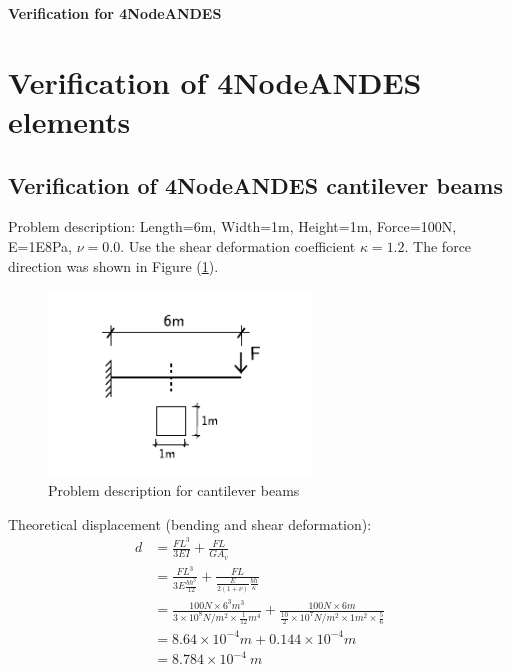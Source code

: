 \documentclass[fleqn,11pt]{article}
\begin{document}


















\newpage
\begin{center}
  \Large\textbf{Verification for 4NodeANDES}
\end{center}


\vskip 24pt

\section{Verification of 4NodeANDES elements}
\subsection{Verification of 4NodeANDES cantilever beams}





Problem description: Length=6m, Width=1m, Height=1m, Force=100N, E=1E8Pa, $\nu=0.0$. Use the shear deformation coefficient $\kappa=1.2$. The force direction was shown in Figure (\ref{fig Problem description for cantilever 4}). 

\begin{figure}[H]
  \centering
  \includegraphics[width=7cm]{../Figure-files/cantilever_6.pdf}
  \caption{Problem description for cantilever beams}
  \label{fig Problem description for cantilever 4}
\end{figure}


Theoretical displacement (bending and shear deformation):
\begin{equation}
  \begin{aligned}
  d &=\frac{FL^3}{3EI}+\frac{FL}{GA_v} \\
  &= \frac{FL^3}{3E\frac{bh^3}{12}}+\frac{FL}{\frac{E}{2(1+\nu)} \frac{bh}{\kappa}} \\ 
    &= \frac{100 N \times 6^3 m^3}{3\times 10^8 N/m^2 \times \frac{1}{12} m^4}+ 
    \frac{100 N\times 6 m}{\frac{10}{2} \times 10^7 N/m^2\times 1 m^2 \times \frac{5}{6}} \\ 
    &=8.64\times 10^{-4} m + 0.144 \times 10^{-4} m   \\
   & =8.784\times 10^{-4} \ m
   \end{aligned}
\end{equation}
\end{document}
